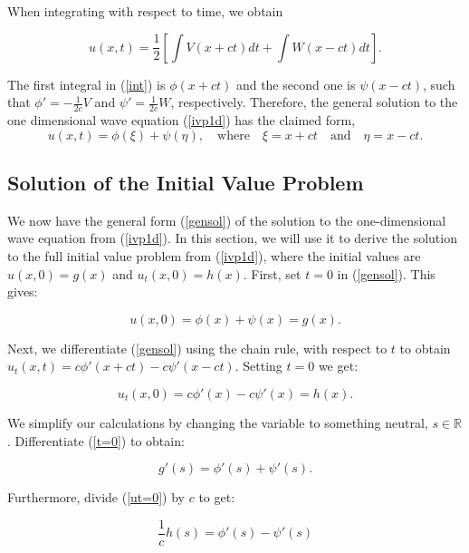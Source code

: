\documentclass[a4paper, 12pt]{article}
\numberwithin{equation}{section}
\begin{document}
When integrating with respect to time, we obtain

\begin{equation} \label{int}
    u(x,t)=\frac{1}{2}\left[\int{V(x+ct)dt}+\int{W(x-ct)dt}\right].
\end{equation}

The first integral in (\ref{int}) is $\phi(x+ct)$ and the second one is $\psi(x-ct)$, such that $\phi'=-\frac{1}{2c}V$ and $\psi'=\frac{1}{2c}W$, respectively.
Therefore, the general solution to the one dimensional wave equation (\ref{ivp1d}) has the claimed form, 
\begin{equation} \label{gensol}
    u(x, t)=\phi(\xi)+\psi(\eta), \quad \textrm{where} \quad \xi=x+ct \quad \textrm{and} \quad \eta=x-ct.
\end{equation}

\subsection{Solution of the Initial Value Problem}
We now have the general form (\ref{gensol}) of the solution to the one-dimensional wave equation from (\ref{ivp1d}). In this section, we will use it to derive the solution to
the full initial value problem from (\ref{ivp1d}), where the initial values are $u(x,0)=g(x)$ and $u_t(x,0)=h(x)$. First, set $t=0$ in (\ref{gensol}). This gives:

\begin{equation} \label{t=0}
    u(x,0)=\phi(x)+\psi(x)=g(x).
\end{equation}

Next, we differentiate (\ref{gensol}) using the chain rule, with respect to $t$ to obtain $u_t(x,t)=c\phi'(x+ct)-c\psi'(x-ct)$. Setting $t=0$ we get:

\begin{equation} \label{ut=0}
    u_t(x,0)=c\phi'(x)-c\psi'(x)=h(x).
\end{equation}

We simplify our calculations by changing the variable to something neutral, $s \in \mathbb{R}$. 
Differentiate (\ref{t=0}) to obtain:

\begin{equation} \label{eqq9}
    g'(s)=\phi'(s)+\psi'(s).
\end{equation}

Furthermore, divide (\ref{ut=0}) by $c$ to get:

\begin{equation} \label{eqq10}
    \frac{1}{c}h(s)=\phi'(s)-\psi'(s)
\end{equation}
\end{document}
